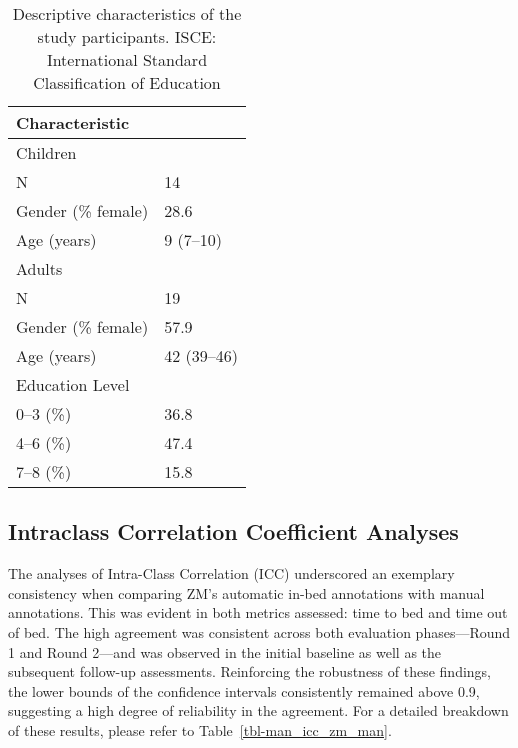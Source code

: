 \documentclass[
  9pt,
]{scrbook}
\begin{document}
\hypertarget{tbl-man_describe}{}
\begin{longtable}{ll}
\caption{\label{tbl-man_describe}Descriptive characteristics of the study participants. ISCE:
International Standard Classification of Education }\tabularnewline

\toprule
Characteristic &  \\ 
\midrule
\multicolumn{2}{l}{Children} \\ 
\midrule
N & 14 \\ 
Gender (\% female) & 28.6 \\ 
Age (years) & 9 (7–10) \\ 
\midrule
\multicolumn{2}{l}{Adults} \\ 
\midrule
N & 19 \\ 
Gender (\% female) & 57.9 \\ 
Age (years) & 42 (39–46) \\ 
Education Level &  \\ 
0–3 (\%) & 36.8 \\ 
4–6 (\%) & 47.4 \\ 
7–8 (\%) & 15.8 \\ 
\bottomrule
\end{longtable}

\endgroup

\hypertarget{intraclass-correlation-coefficient-analyses}{%
\subsection{Intraclass Correlation Coefficient
Analyses}\label{intraclass-correlation-coefficient-analyses}}

The analyses of Intra-Class Correlation (ICC) underscored an exemplary
consistency when comparing ZM's automatic in-bed annotations with manual
annotations. This was evident in both metrics assessed: time to bed and
time out of bed. The high agreement was consistent across both
evaluation phases---Round 1 and Round 2---and was observed in the
initial baseline as well as the subsequent follow-up assessments.
Reinforcing the robustness of these findings, the lower bounds of the
confidence intervals consistently remained above 0.9, suggesting a high
degree of reliability in the agreement. For a detailed breakdown of
these results, please refer to Table~\ref{tbl-man_icc_zm_man}.

\newpage

\begingroup

\footnotesize
\end{document}
